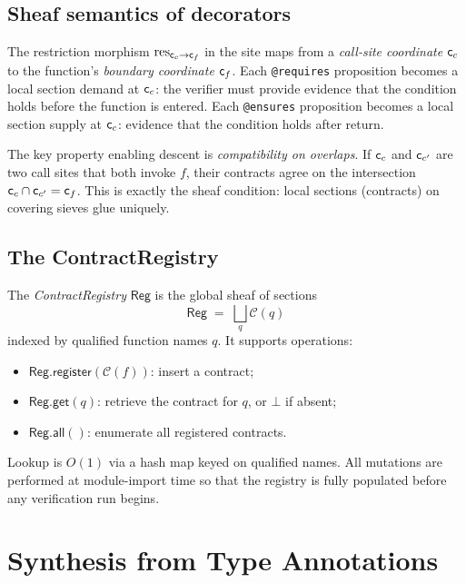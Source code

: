 \documentclass[11pt]{article}
\newcommand{\ContractOf}[1]{\mathcal{C}(#1)}  %
\newcommand{\Reg}{\mathsf{Reg}}            %
\begin{document}
\subsection{Sheaf semantics of decorators}

The restriction morphism $\mathrm{res}_{\mathsf{c}_c \to \mathsf{c}_f}$ in the site
maps from a \emph{call-site coordinate} $\mathsf{c}_c$ to the function's
\emph{boundary coordinate} $\mathsf{c}_f$.  Each \texttt{@requires}
proposition becomes a local section demand at $\mathsf{c}_c$: the verifier
must provide evidence that the condition holds before the function is
entered.  Each \texttt{@ensures} proposition becomes a local section
supply at $\mathsf{c}_c$: evidence that the condition holds after return.

The key property enabling descent is \emph{compatibility on overlaps}.
If $\mathsf{c}_c$ and $\mathsf{c}_{c'}$ are two call sites that both invoke
$f$, their contracts agree on the intersection
$\mathsf{c}_c \cap \mathsf{c}_{c'} = \mathsf{c}_f$.  This is exactly the sheaf
condition: local sections (contracts) on covering sieves glue uniquely.

\subsection{The ContractRegistry}

\begin{definition}[ContractRegistry]\label{def:registry}
The \emph{ContractRegistry} $\Reg$ is the global sheaf of sections
\[
  \Reg \;=\; \bigsqcup_{q} \ContractOf{q}
\]
indexed by qualified function names $q$.  It supports operations:
\begin{itemize}
  \item $\Reg.\mathsf{register}(\ContractOf{f})$: insert a contract;
  \item $\Reg.\mathsf{get}(q)$: retrieve the contract for $q$, or
    $\bot$ if absent;
  \item $\Reg.\mathsf{all}()$: enumerate all registered contracts.
\end{itemize}
\end{definition}

Lookup is $O(1)$ via a hash map keyed on qualified names.  All
mutations are performed at module-import time so that the registry is
fully populated before any verification run begins.

\section{Synthesis from Type Annotations}\label{sec:type-synthesis}
\end{document}
